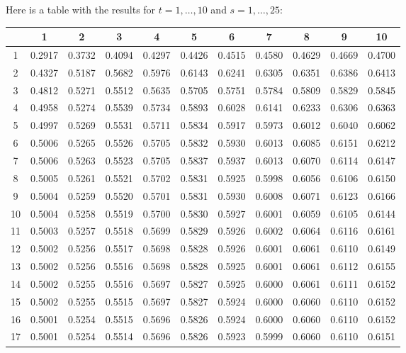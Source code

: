\documentclass[11pt]{article}
\begin{document}

Here is a table with the results for $t=1,\ldots{},10$ and $s=1,\ldots{},25$:

\begin{tabular}{|c|c|c|c|c|c|c|c|c|c|c|}
\hline 
 &1 &2 &3 &4 &5 &6 &7 &8 &9 &10 \\
 \hline 
1 &0.2917 &0.3732 &0.4094 &0.4297 &0.4426 &0.4515 &0.4580 &0.4629 &0.4669 &0.4700 \\
 \hline 
2 &0.4327 &0.5187 &0.5682 &0.5976 &0.6143 &0.6241 &0.6305 &0.6351 &0.6386 &0.6413 \\
 \hline 
3 &0.4812 &0.5271 &0.5512 &0.5635 &0.5705 &0.5751 &0.5784 &0.5809 &0.5829 &0.5845 \\
 \hline 
4 &0.4958 &0.5274 &0.5539 &0.5734 &0.5893 &0.6028 &0.6141 &0.6233 &0.6306 &0.6363 \\
 \hline 
5 &0.4997 &0.5269 &0.5531 &0.5711 &0.5834 &0.5917 &0.5973 &0.6012 &0.6040 &0.6062 \\
 \hline 
6 &0.5006 &0.5265 &0.5526 &0.5705 &0.5832 &0.5930 &0.6013 &0.6085 &0.6151 &0.6212 \\
 \hline 
7 &0.5006 &0.5263 &0.5523 &0.5705 &0.5837 &0.5937 &0.6013 &0.6070 &0.6114 &0.6147 \\
 \hline 
8 &0.5005 &0.5261 &0.5521 &0.5702 &0.5831 &0.5925 &0.5998 &0.6056 &0.6106 &0.6150 \\
 \hline 
9 &0.5004 &0.5259 &0.5520 &0.5701 &0.5831 &0.5930 &0.6008 &0.6071 &0.6123 &0.6166 \\
 \hline 
10 &0.5004 &0.5258 &0.5519 &0.5700 &0.5830 &0.5927 &0.6001 &0.6059 &0.6105 &0.6144 \\
 \hline 
11 &0.5003 &0.5257 &0.5518 &0.5699 &0.5829 &0.5926 &0.6002 &0.6064 &0.6116 &0.6161 \\
 \hline 
12 &0.5002 &0.5256 &0.5517 &0.5698 &0.5828 &0.5926 &0.6001 &0.6061 &0.6110 &0.6149 \\
 \hline 
13 &0.5002 &0.5256 &0.5516 &0.5698 &0.5828 &0.5925 &0.6001 &0.6061 &0.6112 &0.6155 \\
 \hline 
14 &0.5002 &0.5255 &0.5516 &0.5697 &0.5827 &0.5925 &0.6000 &0.6061 &0.6111 &0.6152 \\
 \hline 
15 &0.5002 &0.5255 &0.5515 &0.5697 &0.5827 &0.5924 &0.6000 &0.6060 &0.6110 &0.6152 \\
 \hline 
16 &0.5001 &0.5254 &0.5515 &0.5696 &0.5826 &0.5924 &0.6000 &0.6060 &0.6110 &0.6152 \\
 \hline 
17 &0.5001 &0.5254 &0.5514 &0.5696 &0.5826 &0.5923 &0.5999 &0.6060 &0.6110 &0.6151 \\

\end{tabular}
\end{document}
